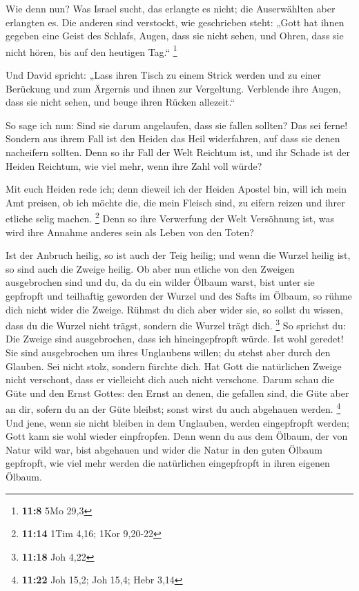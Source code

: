  Wie denn nun? Was Israel sucht, das erlangte es nicht; die
Auserwählten aber erlangten es. Die anderen sind verstockt, 
wie geschrieben steht: „Gott hat ihnen gegeben eine Geist des Schlafs,
Augen, dass sie nicht sehen, und Ohren, dass sie nicht hören, bis auf
den heutigen Tag.`` \footnote{\textbf{11:8} 5Mo 29,3}

 Und David spricht: „Lass ihren Tisch zu einem Strick werden
und zu einer Berückung und zum Ärgernis und ihnen zur Vergeltung.
 Verblende ihre Augen, dass sie nicht sehen, und beuge
ihren Rücken allezeit.``

 So sage ich nun: Sind sie darum angelaufen, dass sie
fallen sollten? Das sei ferne! Sondern aus ihrem Fall ist den Heiden das
Heil widerfahren, auf dass sie denen nacheifern sollten. 
Denn so ihr Fall der Welt Reichtum ist, und ihr Schade ist der Heiden
Reichtum, wie viel mehr, wenn ihre Zahl voll würde?

 Mit euch Heiden rede ich; denn dieweil ich der Heiden
Apostel bin, will ich mein Amt preisen,  ob ich möchte die,
die mein Fleisch sind, zu eifern reizen und ihrer etliche selig machen.
\footnote{\textbf{11:14} 1Tim 4,16; 1Kor 9,20-22}  Denn so
ihre Verwerfung der Welt Versöhnung ist, was wird ihre Annahme anderes
sein als Leben von den Toten?

 Ist der Anbruch heilig, so ist auch der Teig heilig; und
wenn die Wurzel heilig ist, so sind auch die Zweige heilig.
 Ob aber nun etliche von den Zweigen ausgebrochen sind und
du, da du ein wilder Ölbaum warst, bist unter sie gepfropft und
teilhaftig geworden der Wurzel und des Safts im Ölbaum,  so
rühme dich nicht wider die Zweige. Rühmst du dich aber wider sie, so
sollst du wissen, dass du die Wurzel nicht trägst, sondern die Wurzel
trägt dich. \footnote{\textbf{11:18} Joh 4,22}  So sprichst
du: Die Zweige sind ausgebrochen, dass ich hineingepfropft würde.
 Ist wohl geredet! Sie sind ausgebrochen um ihres
Unglaubens willen; du stehst aber durch den Glauben. Sei nicht stolz,
sondern fürchte dich.  Hat Gott die natürlichen Zweige
nicht verschont, dass er vielleicht dich auch nicht verschone.
 Darum schau die Güte und den Ernst Gottes: den Ernst an
denen, die gefallen sind, die Güte aber an dir, sofern du an der Güte
bleibst; sonst wirst du auch abgehauen werden. \footnote{\textbf{11:22}
  Joh 15,2; Joh 15,4; Hebr 3,14}  Und jene, wenn sie nicht
bleiben in dem Unglauben, werden eingepfropft werden; Gott kann sie wohl
wieder einpfropfen.  Denn wenn du aus dem Ölbaum, der von
Natur wild war, bist abgehauen und wider die Natur in den guten Ölbaum
gepfropft, wie viel mehr werden die natürlichen eingepfropft in ihren
eigenen Ölbaum.

